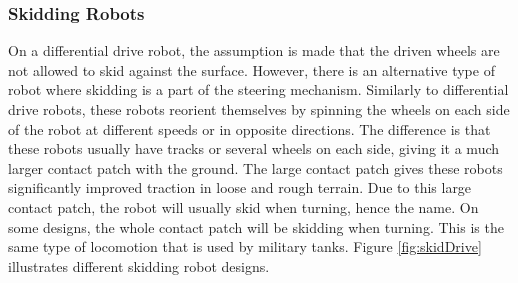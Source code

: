 %   




\subsubsection{Skidding Robots} \label{sec:T:AN:MRD:SkiddingRobots}
On a differential drive robot, the assumption is made that the driven wheels are not allowed to skid against the surface. However, there is an alternative type of robot where skidding is a part of the steering mechanism. Similarly to differential drive robots, these robots reorient themselves by spinning the wheels on each side of the robot at different speeds or in opposite directions. The difference is that these robots usually have tracks or several wheels on each side, giving it a much larger contact patch with the ground. The large contact patch gives these robots significantly improved traction in loose and rough terrain. Due to this large contact patch, the robot will usually skid when turning, hence the name. On some designs, the whole contact patch will be skidding when turning. This is the same type of locomotion that is used by military tanks\cite{SiegwartRoland2011Itam}. Figure \ref{fig:skidDrive} illustrates different skidding robot designs.

